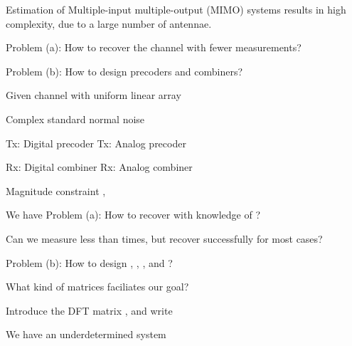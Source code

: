 
\Title {\TitleText}
\blank [big]

\Subtitle {\AuthorText}
\blank [big]

\Subsubtitle {\InstitutionText}

\page [yes]
{
\blank [big]

\I Estimation of Multiple-input multiple-output (MIMO) systems results in high complexity, due to a large number of antennae.

\I Problem (a): How to recover the channel with fewer measurements?

\I Problem (b): How to design precoders and combiners?
}
{
\I Given channel  with uniform linear array

\I Complex standard normal noise 

\I Tx: Digital precoder 
\I Tx: Analog precoder 

\I Rx: Digital combiner 
\I Rx: Analog combiner 

\I Magnitude constraint ,  
}
{
\I We have 
%
\I Problem (a): How to recover  with knowledge of ?

\I Can we measure less than  times, but recover successfully for most cases?

\I Problem (b): How to design , , , and ?

\I What kind of matrices faciliates our goal?
}
{
\I Introduce the DFT matrix , and write

\I We have an underdetermined system 
}
